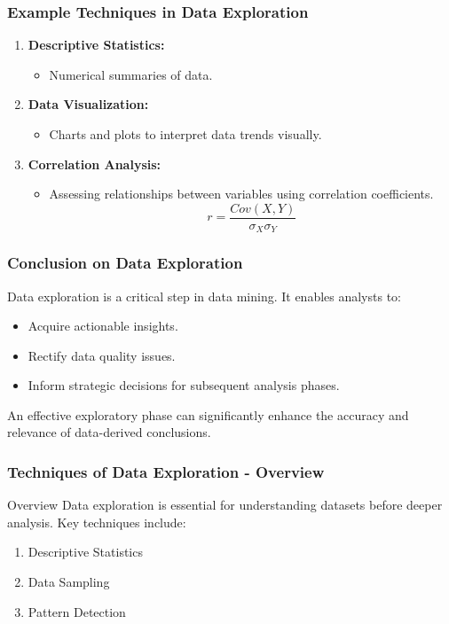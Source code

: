 \documentclass[aspectratio=169]{beamer}
\begin{document}
\begin{frame}[fragile]
    \frametitle{Example Techniques in Data Exploration}
    \begin{enumerate}
        \item \textbf{Descriptive Statistics:} 
            \begin{itemize}
                \item Numerical summaries of data.
            \end{itemize}
        \item \textbf{Data Visualization:} 
            \begin{itemize}
                \item Charts and plots to interpret data trends visually.
            \end{itemize}
        \item \textbf{Correlation Analysis:} 
            \begin{itemize}
                \item Assessing relationships between variables using correlation coefficients.
                \begin{equation}
                r = \frac{Cov(X, Y)}{\sigma_X \sigma_Y}
                \end{equation}
            \end{itemize}
    \end{enumerate}
\end{frame}

\begin{frame}[fragile]
    \frametitle{Conclusion on Data Exploration}
    Data exploration is a critical step in data mining. It enables analysts to:
    \begin{itemize}
        \item Acquire actionable insights.
        \item Rectify data quality issues.
        \item Inform strategic decisions for subsequent analysis phases.
    \end{itemize}
    An effective exploratory phase can significantly enhance the accuracy and relevance of data-derived conclusions.
\end{frame}

\begin{frame}[fragile]
    \frametitle{Techniques of Data Exploration - Overview}
    \begin{block}{Overview}
        Data exploration is essential for understanding datasets before deeper analysis. 
        Key techniques include:
    \end{block}
    \begin{enumerate}
        \item Descriptive Statistics
        \item Data Sampling
        \item Pattern Detection
    \end{enumerate}
\end{frame}
\end{document}
